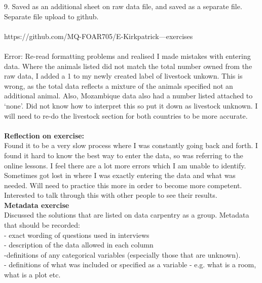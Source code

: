 \documentclass{article}
\begin{document}
9.	Saved as an additional sheet on raw data file, and saved as a separate file. Separate file upload to github.  \\
\\
https://github.com/MQ-FOAR705/E-Kirkpatrick---exercises\\
\\
{Error: Re-read formatting problems and realised I made mistakes with entering data. Where the animals listed did not match the total number owned from the raw data, I added a 1 to my newly created label of livestock unkown. This is wrong, as the total data reflects a mixture of the animals specified not an additional animal. Also, Mozambique data also had a number listed attached to ‘none’. Did not know how to interpret this so put it down as livestock unknown. I will need to re-do the livestock section for both countries to be more accurate.}\\
\\
\textbf{Reflection on exercise:}\\
Found it to be a very slow process where I was constantly going back and forth. I found it hard to know the best way to enter the data, so was referring to the online lessons. I feel there are a lot more errors which I am unable to identify. Sometimes got lost in where I was exactly entering the data and what was needed. Will need to practice this more in order to become more competent. Interested to talk through this with other people to see their results. \\

\textbf{Metadata exercise}\\
Discussed the solutions that are listed on data carpentry  as a group. 
Metadata that should be recorded:\\
- exact wording of questions used in interviews\\
- description of the data allowed in each column\\
-definitions of any categorical variables (especially those that are unknown). \\
- definitions of what was included or specified as a variable - e.g. what is a room, what is a plot etc. \\
\end{document}
